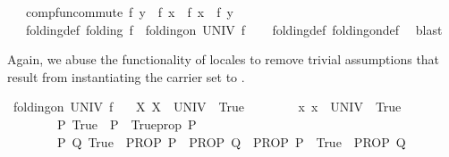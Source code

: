 \begin{isabellebody}
\ \ \ comp{\isacharunderscore}{\kern0pt}fun{\isacharunderscore}{\kern0pt}commute{\isacharcolon}{\kern0pt}\ {\isachardoublequoteopen}f\ y\ {\isasymcirc}\ f\ x\ {\isacharequal}{\kern0pt}\ f\ x\ {\isasymcirc}\ f\ y{\isachardoublequoteclose}\isanewline
{}\isanewline
\isanewline
{}\isamarkupfalse%
\ {\isacharparenleft}{\kern0pt}\ {\isacharminus}{\kern0pt}{\isacharparenright}{\kern0pt}\ folding{\isacharunderscore}{\kern0pt}def{\isacharprime}{\kern0pt}{\isacharcolon}{\kern0pt}\ {\isachardoublequoteopen}folding\ f\ {\isacharequal}{\kern0pt}\ folding{\isacharunderscore}{\kern0pt}on\ UNIV\ f{\isachardoublequoteclose}\isanewline
%
\isadelimproof
\ \ %
\endisadelimproof
%
\isatagproof
{}\isamarkupfalse%
\ folding{\isacharunderscore}{\kern0pt}def\ folding{\isacharunderscore}{\kern0pt}on{\isacharunderscore}{\kern0pt}def\ \isamarkupfalse%
\ blast%
\endisatagproof
{\isafoldproof}%
%
\isadelimproof
%
\endisadelimproof
%
\begin{isamarkuptext}%
Again, we abuse the  functionality of locales to remove trivial assumptions that
  result from instantiating the carrier set to .%
\end{isamarkuptext}\isamarkuptrue%
\isamarkupfalse%
\ folding{\isacharunderscore}{\kern0pt}on\ UNIV\ f\isanewline
\ \ \ {\isachardoublequoteopen}{\isasymAnd}X{\isachardot}{\kern0pt}\ {\isacharparenleft}{\kern0pt}X\ {\isasymsubseteq}\ UNIV{\isacharparenright}{\kern0pt}\ {\isasymequiv}\ True{\isachardoublequoteclose}\isanewline
\ \ \ \ \ \ \ \ {\isachardoublequoteopen}{\isasymAnd}x{\isachardot}{\kern0pt}\ x\ {\isasymin}\ UNIV\ {\isasymequiv}\ True{\isachardoublequoteclose}\isanewline
\ \ \ \ \ \ \ \ {\isachardoublequoteopen}{\isasymAnd}P{\isachardot}{\kern0pt}\ {\isacharparenleft}{\kern0pt}True\ {\isasymLongrightarrow}\ P{\isacharparenright}{\kern0pt}\ {\isasymequiv}\ Trueprop\ P{\isachardoublequoteclose}\isanewline
\ \ \ \ \ \ \ \ {\isachardoublequoteopen}{\isasymAnd}P\ Q{\isachardot}{\kern0pt}\ {\isacharparenleft}{\kern0pt}True\ {\isasymLongrightarrow}\ PROP\ P\ {\isasymLongrightarrow}\ PROP\ Q{\isacharparenright}{\kern0pt}\ {\isasymequiv}\ {\isacharparenleft}{\kern0pt}PROP\ P\ {\isasymLongrightarrow}\ True\ {\isasymLongrightarrow}\ PROP\ Q{\isacharparenright}{\kern0pt}{\isachardoublequoteclose}\isanewline
%
\isadelimproof
%
\endisadelimproof
%
\isatagproof
{}\isamarkupfalse%
\ {\isacharminus}{\kern0pt}\isanewline

\end{isabellebody}
